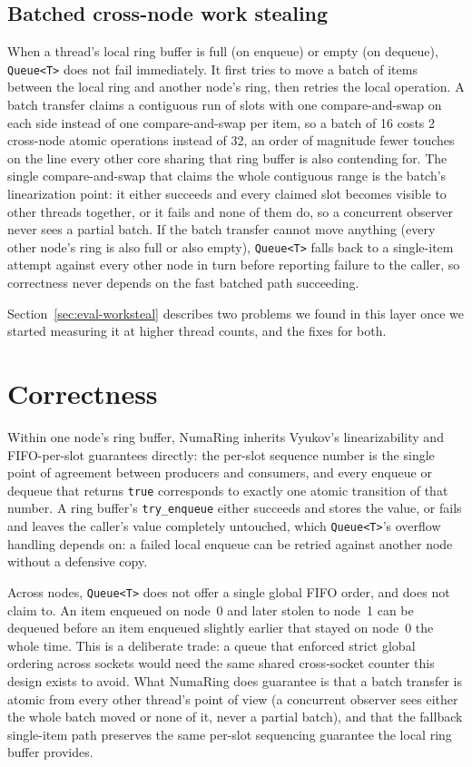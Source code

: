 \documentclass[10pt,journal,compsoc]{IEEEtran}
\begin{document}
\subsection{Batched cross-node work stealing}
\label{sec:worksteal}

When a thread's local ring buffer is full (on enqueue) or empty (on dequeue), \texttt{Queue<T>}
does not fail immediately. It first tries to move a batch of items between the local ring and
another node's ring, then retries the local operation. A batch transfer claims a contiguous run of
slots with one compare-and-swap on each side instead of one compare-and-swap per item, so a batch
of 16 costs 2 cross-node atomic operations instead of 32, an order of magnitude fewer touches on
the line every other core sharing that ring buffer is also contending for. The single
compare-and-swap that claims the whole contiguous range is the batch's linearization point: it
either succeeds and every claimed slot becomes visible to other threads together, or it fails and
none of them do, so a concurrent observer never sees a partial batch. If the batch transfer
cannot move anything (every other node's ring is also full or also empty), \texttt{Queue<T>} falls
back to a single-item attempt against every other node in turn before reporting failure to the
caller, so correctness never depends on the fast batched path succeeding.

Section~\ref{sec:eval-worksteal} describes two problems we found in this layer once we started
measuring it at higher thread counts, and the fixes for both.

\section{Correctness}
\label{sec:correctness}

Within one node's ring buffer, NumaRing inherits Vyukov's linearizability and FIFO-per-slot
guarantees directly: the per-slot sequence number is the single point of agreement between
producers and consumers, and every enqueue or dequeue that returns \texttt{true} corresponds to
exactly one atomic transition of that number. A ring buffer's \texttt{try\_enqueue} either
succeeds and stores the value, or fails and leaves the caller's value completely untouched, which
\texttt{Queue<T>}'s overflow handling depends on: a failed local enqueue can be retried against
another node without a defensive copy.

Across nodes, \texttt{Queue<T>} does not offer a single global FIFO order, and does not claim to.
An item enqueued on node~0 and later stolen to node~1 can be dequeued before an item enqueued
slightly earlier that stayed on node~0 the whole time. This is a deliberate trade: a queue that
enforced strict global ordering across sockets would need the same shared cross-socket counter this
design exists to avoid. What NumaRing does guarantee is that a batch transfer is atomic from every
other thread's point of view (a concurrent observer sees either the whole batch moved or none of
it, never a partial batch), and that the fallback single-item path preserves the same per-slot
sequencing guarantee the local ring buffer provides.
\end{document}
